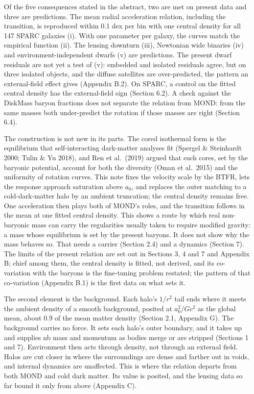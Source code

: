 \documentclass[
  10pt,
]{article}
\begin{document}
Of the five consequences stated in the abstract, two are met on present data and three are predictions. The mean radial acceleration relation, including the transition, is reproduced within 0.1 dex per bin with one central density for all 147 SPARC galaxies (i). With one parameter per galaxy, the curves match the empirical function (ii). The lensing downturn (iii), Newtonian wide binaries (iv) and environment-independent dwarfs (v) are predictions. The present dwarf residuals are not yet a test of (v): embedded and isolated residuals agree, but on three isolated objects, and the diffuse satellites are over-predicted, the pattern an external-field effect gives (Appendix B.2). On SPARC, a control on the fitted central density has the external-field sign (Section 6.2). A check against the DiskMass baryon fractions does not separate the relation from MOND: from the same masses both under-predict the rotation if those masses are right (Section 6.4).

The construction is not new in its parts. The cored isothermal form is the equilibrium that self-interacting dark-matter analyses fit (Spergel \& Steinhardt 2000; Tulin \& Yu 2018), and Ren et al.~(2019) argued that such cores, set by the baryonic potential, account for both the diversity (Oman et al.~2015) and the uniformity of rotation curves. This note fixes the velocity scale by the BTFR, lets the response approach saturation above $a_0$, and replaces the outer matching to a cold-dark-matter halo by an ambient truncation; the central density remains free. One acceleration then plays both of MOND's roles, and the transition follows in the mean at one fitted central density. This shows a route by which real non-baryonic mass can carry the regularities usually taken to require modified gravity: a mass whose equilibrium is set by the present baryons. It does not show why the mass behaves so. That needs a carrier (Section 2.4) and a dynamics (Section 7). The limits of the present relation are set out in Sections 3, 4 and 7 and Appendix B; chief among them, the central density is fitted, not derived, and its co-variation with the baryons is the fine-tuning problem restated; the pattern of that co-variation (Appendix B.1) is the first data on what sets it.

The second element is the background. Each halo's $1/r^2$ tail ends where it meets the ambient density of a smooth background, posited at $a_0^2/Gc^2$ as the global mean, about 0.9 of the mean matter density (Section 2.1, Appendix G). The background carries no force. It sets each halo's outer boundary, and it takes up and supplies nb mass and momentum as bodies merge or are stripped (Sections 1 and 7). Environment then acts through density, not through an external field. Halos are cut closer in where the surroundings are dense and farther out in voids, and internal dynamics are unaffected. This is where the relation departs from both MOND and cold dark matter. Its value is posited, and the lensing data so far bound it only from above (Appendix C).
\end{document}
